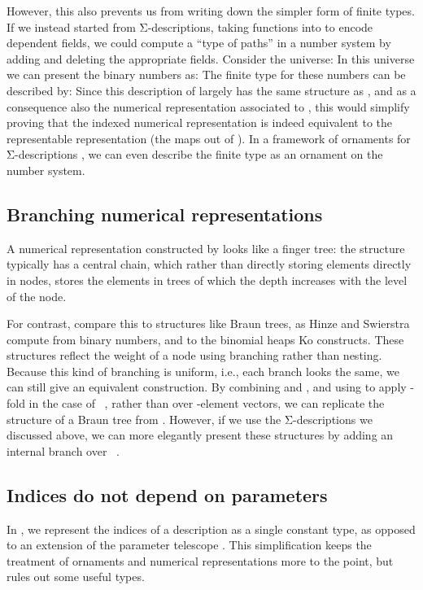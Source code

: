 However, this also prevents us from writing down the simpler form of finite types. If we instead started from Σ-descriptions, taking functions into  to encode dependent fields, we could compute a ``type of paths'' in a number system by adding and deleting the appropriate fields. Consider the universe:
In this universe we can present the binary numbers as:
The finite type for these numbers can be described by:
Since this description of  largely has the same structure as , and as a consequence also the numerical representation associated to , this would simplify proving that the indexed numerical representation is indeed equivalent to the representable representation (the maps out of ). In a framework of ornaments for Σ-descriptions \cite{progorn,algorn}, we can even describe the finite type as an ornament on the number system.


\subsection{Branching numerical representations}
A numerical representation constructed by  looks like a finger tree: the structure typically has a central chain, which rather than directly storing elements directly in nodes, stores the elements in trees of which the depth increases with the level of the node.

For contrast, compare this to structures like Braun trees, as Hinze and Swierstra \cite{calcdata} compute from binary numbers, and to the binomial heaps \cite{kophd} Ko constructs. These structures reflect the weight of a node using branching rather than nesting. Because this kind of branching is uniform, i.e., each branch looks the same, we can still give an equivalent construction. By combining  and , and using 
to apply  -fold in the case of \ , rather than over -element vectors, we can replicate the structure of a Braun tree from . However, if we use the Σ-descriptions we discussed above, we can more elegantly present these structures by adding an internal branch over \ .

\subsection{Indices do not depend on parameters}\label{sec:no-dep-ix}
In , we represent the indices of a description as a single constant type, as opposed to an extension of the parameter telescope \cite{practgen}. This simplification keeps the treatment of ornaments and numerical representations more to the point, but rules out some useful types.

